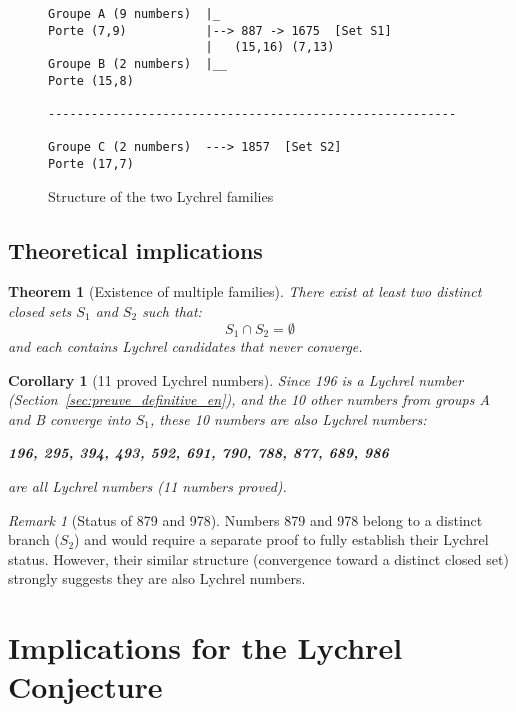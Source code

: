 \documentclass[12pt,a4paper]{article}
\newtheorem{theorem}{Theorem}[section]
\newtheorem{corollary}{Corollary}[section]
\theoremstyle{remark}
\newtheorem{remark}{Remark}[section]
\begin{document}
\begin{figure}[h]
\centering
\begin{verbatim}
Groupe A (9 numbers)  |_
Porte (7,9)           |--> 887 -> 1675  [Set S1]
                      |   (15,16) (7,13)
Groupe B (2 numbers)  |__
Porte (15,8)

---------------------------------------------------------

Groupe C (2 numbers)  ---> 1857  [Set S2]
Porte (17,7)
\end{verbatim}
\caption{Structure of the two Lychrel families}
\end{figure}

\subsection{Theoretical implications}

\begin{theorem}[Existence of multiple families]
There exist at least two distinct closed sets $S_1$ and $S_2$ such that:
\[
S_1 \cap S_2 = \emptyset
\]
and each contains Lychrel candidates that never converge.
\end{theorem}

\begin{corollary}[11 proved Lychrel numbers]
Since 196 is a Lychrel number (Section~\ref{sec:preuve_definitive_en}), and the 10 other numbers from groups A and B converge into $S_1$, these 10 numbers are also Lychrel numbers:

\begin{center}
\textbf{196, 295, 394, 493, 592, 691, 790, 788, 877, 689, 986}
\end{center}

are all Lychrel numbers (11 numbers proved).
\end{corollary}

\begin{remark}[Status of 879 and 978]
Numbers 879 and 978 belong to a distinct branch ($S_2$) and would require a separate proof to fully establish their Lychrel status. However, their similar structure (convergence toward a distinct closed set) strongly suggests they are also Lychrel numbers.
\end{remark}


\section{Implications for the Lychrel Conjecture}
\label{sec:conjecture_en}
\end{document}
